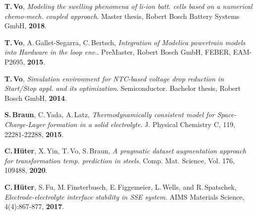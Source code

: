 \documentclass[25pt, a0paper,
portrait,
margin=2mm, 
innermargin=2mm, 
blockverticalspace=7mm, %
colspace=2mm, %
subcolspace=0mm]{tikzposter}
\begin{document}
\begin{columns}
{\begin{thebibliography}{2}
			\textbf{T.\,Vo},
			\emph{Modeling the swelling phenomena of li-ion batt. cells based on a numerical chemo-mech. coupled approach}.
			Master thesis, Robert Bosch Battery Systems GmbH, \textbf{2018}.
			
			\textbf{T.\,Vo}, A.\,Gallet-Segarra, C.\,Bertsch,
			\emph{Integration of Modelica powertrain models into Hardware in the loop env.}.
			PreMaster, Robert Bosch GmbH, FEBER, EAM-P2695, \textbf{2015}.
			
			\textbf{T.\,Vo},
			\emph{Simulation environment for NTC-based voltage drop reduction in Start/Stop appl. and its optimization}.
			Semiconductor.
			Bachelor thesis, Robert Bosch GmbH, \textbf{2014}.
			
			\textbf{S.\,Braun}, C.\,Yada, A.\,Latz,
			\emph{Thermodynamically consistent model for Space-Charge-Layer formation in a solid electrolyte}.
			J. Physical Chemistry C, 119, 22281-22288, \textbf{2015}.
			
			\textbf{C.\,Hüter}, X.\,Yin, T.\,Vo, S.\,Braun,
			\emph{A pragmatic dataset augmentation approach for transformation temp. prediction in steels}. 
			Comp. Mat. Science, Vol. 176, 109488, \textbf{2020}.
			
			\textbf{C.\,Hüter}, S.\,Fu, M.\,Finsterbusch, E.\,Figgemeier, L.\,Wells, and R.\,Spatschek,
			\emph{Electrode-electrolyte interface stability in SSE system.
			}
			AIMS Materials Science, 4(4):867-877, \textbf{2017}.
			
			
		\end{thebibliography}
		\vspace{-6mm}
	}
	

\end{columns}
\end{document}
